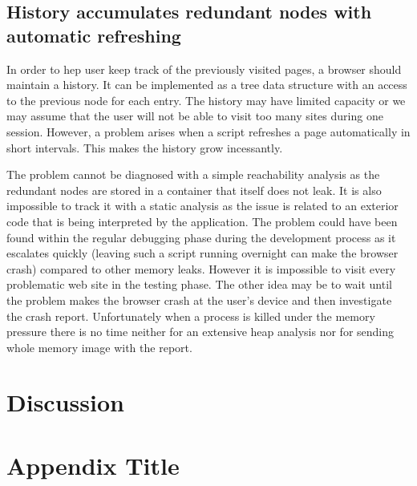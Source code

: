 \documentclass[preprint, numbers]{sigplanconf}
\newcommand{\comment}[1]{{\color{blue}{#1}}}
\begin{document}
\subsection{History accumulates redundant nodes with automatic refreshing}

In order to hep user keep track of the previously visited pages, a browser should maintain a history.
It can be implemented as a tree data structure with an access to the previous node for each entry.
The history may have limited capacity or
we may assume that the user will not be able
to visit too many sites during one session.
However, a problem arises when a script refreshes a page automatically in short intervals.
This makes the history grow incessantly.

The problem cannot be diagnosed with a simple reachability analysis as the redundant
nodes are stored in a container that itself does not leak.
It is also impossible to track it with a static analysis as the issue is related to an exterior
code that is being interpreted by the application.
The problem could have been found within the regular debugging phase during the development process as
it escalates quickly (leaving such a script running overnight can make the browser crash)
compared to other memory leaks.
However it is impossible to visit every problematic web site in the testing phase.
The other idea may be to wait until the problem makes the browser crash at the user's device
and then investigate the crash report.
Unfortunately when a process is killed under the memory pressure there is no time neither for an extensive
heap analysis nor for sending whole memory image with the report.

\section{Discussion}
\comment{What are the ideas for defining allocation groups?
Ask a questions about possible better heuristics, maybe compare the net allocation number of each group
to the mean or median?}

\appendix
\section{Appendix Title}

\comment{This is the text of the appendix.}

\acks

\comment{Acknowledgments, if needed.}






\end{document}
